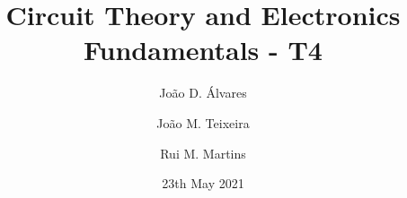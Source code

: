 \title{\textbf{Circuit Theory and Electronics Fundamentals - T4}}
\author[1]{João D. Álvares}
\author[1]{João M. Teixeira}
\author[1]{Rui M. Martins}


\date{23th May 2021}